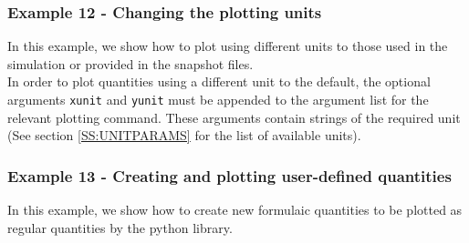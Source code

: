 \documentclass[a4paper]{article}
\newcommand{\var}[1]{\texttt{#1}}
\begin{document}
\subsubsection{Example  12 - Changing the plotting units}
In this example, we show how to plot using different units to those used in the simulation or provided in the snapshot files. \\





\noindent In order to plot quantities using a different unit to the default, the optional arguments \var{xunit} and \var{yunit} must be appended to the argument list for the relevant plotting command.  These arguments contain strings of the required unit (See section \ref{SS:UNITPARAMS} for the list of available units).


\subsubsection{Example  13 - Creating and plotting user-defined quantities}
In this example, we show how to create new formulaic quantities to be plotted as regular quantities by the python library. \\

\end{document}
